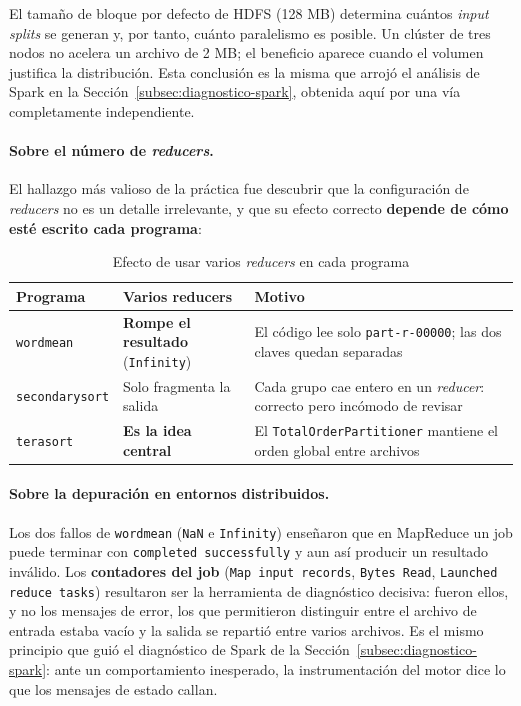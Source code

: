 El tamaño de bloque por defecto de HDFS (128 MB) determina cuántos \textit{input splits} se generan y, por tanto, cuánto paralelismo es posible. Un clúster de tres nodos no acelera un archivo de 2 MB; el beneficio aparece cuando el volumen justifica la distribución. Esta conclusión es la misma que arrojó el análisis de Spark en la Sección~\ref{subsec:diagnostico-spark}, obtenida aquí por una vía completamente independiente.

\paragraph{Sobre el número de \textit{reducers}.} El hallazgo más valioso de la práctica fue descubrir que la configuración de \textit{reducers} no es un detalle irrelevante, y que su efecto correcto \textbf{depende de cómo esté escrito cada programa}:

\begin{table}[H]
\centering
\caption{Efecto de usar varios \textit{reducers} en cada programa}
\label{tab:hadoop-reducers}
\vspace{0.2cm}
\small
\begin{tabular}{@{}llp{6.6cm}@{}}
\toprule
\textbf{Programa} & \textbf{Varios reducers} & \textbf{Motivo} \\
\midrule
\texttt{wordmean}      & \textbf{Rompe el resultado} (\texttt{Infinity}) & El código lee solo \texttt{part-r-00000}; las dos claves quedan separadas \\
\texttt{secondarysort} & Solo fragmenta la salida & Cada grupo cae entero en un \textit{reducer}: correcto pero incómodo de revisar \\
\texttt{terasort}      & \textbf{Es la idea central} & El \texttt{TotalOrderPartitioner} mantiene el orden global entre archivos \\
\bottomrule
\end{tabular}
\end{table}

\paragraph{Sobre la depuración en entornos distribuidos.} Los dos fallos de \texttt{wordmean} (\texttt{NaN} e \texttt{Infinity}) enseñaron que en MapReduce un job puede terminar con \texttt{completed successfully} y aun así producir un resultado inválido. Los \textbf{contadores del job} (\texttt{Map input records}, \texttt{Bytes Read}, \texttt{Launched reduce tasks}) resultaron ser la herramienta de diagnóstico decisiva: fueron ellos, y no los mensajes de error, los que permitieron distinguir entre \guillemotleft{}el archivo de entrada estaba vacío\guillemotright{} y \guillemotleft{}la salida se repartió entre varios archivos\guillemotright{}. Es el mismo principio que guió el diagnóstico de Spark de la Sección~\ref{subsec:diagnostico-spark}: ante un comportamiento inesperado, la instrumentación del motor dice lo que los mensajes de estado callan.

